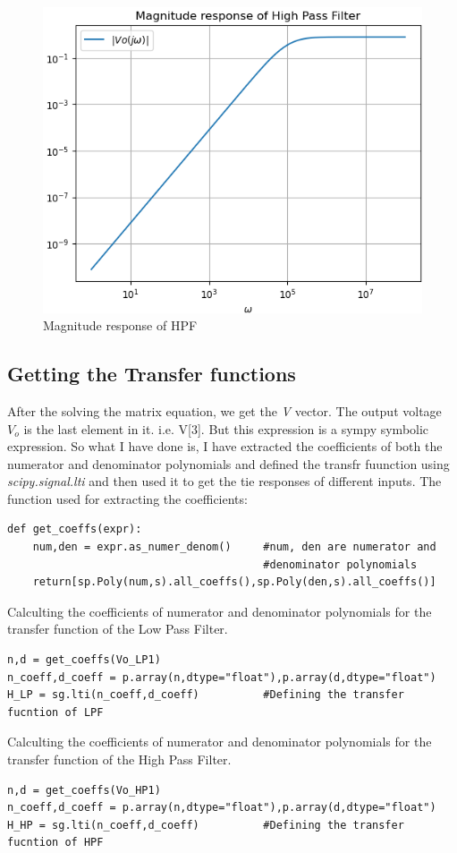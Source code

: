 \documentclass[11pt, a4paper]{article}
\begin{document}
    \begin{figure}[!h]
        \centering
        \includegraphics[scale=0.67]{Figure 2.png}
        \caption{Magnitude response of HPF}
        \label{fig:Figure 2}
    \end{figure}
\subsection{Getting the Transfer functions}
    After the solving the matrix equation, we get the \textit{V} vector. The output voltage $V_o$ is the last element in it. i.e. V[$3$]. But this expression is a sympy symbolic expression. So what I have done is, I have extracted the coefficients of both the numerator and denominator polynomials and defined the transfr fuunction using \textit{scipy.signal.lti} and then used it to get the tie responses of different inputs. The function used for extracting the coefficients: 
    \begin{verbatim}
def get_coeffs(expr):
    num,den = expr.as_numer_denom()     #num, den are numerator and
                                        #denominator polynomials
    return[sp.Poly(num,s).all_coeffs(),sp.Poly(den,s).all_coeffs()] 
    \end{verbatim}
    Calculting the coefficients of numerator and denominator polynomials for the transfer function of the Low Pass Filter.
    \begin{verbatim}
n,d = get_coeffs(Vo_LP1)
n_coeff,d_coeff = p.array(n,dtype="float"),p.array(d,dtype="float")
H_LP = sg.lti(n_coeff,d_coeff)          #Defining the transfer fucntion of LPF
    \end{verbatim}
    Calculting the coefficients of numerator and denominator polynomials for the transfer function of the High Pass Filter.
    \begin{verbatim}
n,d = get_coeffs(Vo_HP1)
n_coeff,d_coeff = p.array(n,dtype="float"),p.array(d,dtype="float")
H_HP = sg.lti(n_coeff,d_coeff)          #Defining the transfer fucntion of HPF
    \end{verbatim}
\end{document}
